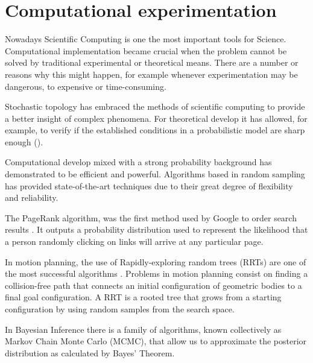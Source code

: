 
\chapter{Computational experimentation} %

\label{Chapter3} %



Nowadays Scientific Computing is one the most important tools for Science. Computational implementation became crucial when the problem cannot be solved by traditional experimental or theoretical means. There are a number or reasons why this might happen, for example whenever experimentation may be dangerous, to expensive or time-consuming.

Stochastic topology has embraced the methods of scientific computing to provide a better insight of complex phenomena. For theoretical develop it has allowed, for example, to verify if the established conditions in a probabilistic model are sharp enough (\cite{Meshulam13}). 

Computational develop mixed with a strong probability background has demonstrated to be efficient and powerful. Algorithms based in random sampling has provided state-of-the-art techniques due to their great degree of flexibility and reliability.

The PageRank algorithm, was the first method used by Google to order search results \cite{pageRank}. It outputs a probability distribution used to represent the likelihood that a person randomly clicking on links will arrive at any particular page.

In motion planning, the use of Rapidly-exploring random trees (RRTs) are one of the most successful algorithms \cite{Alcazar15}. Problems in motion planning consist on finding a collision-free path that connects an initial configuration of geometric bodies to a final goal configuration. A RRT is a rooted tree that grows from a starting configuration by using random samples from the search space. 

In Bayesian Inference there is a family of algorithms, known collectively as Markov Chain Monte Carlo (MCMC), that allow us to approximate the posterior distribution as calculated by Bayes' Theorem.

